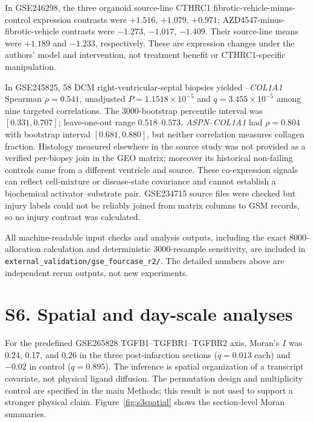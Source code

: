 \documentclass[11pt]{article}
\begin{document}
In GSE246298, the three organoid source-line CTHRC1 fibrotic-vehicle-minus-control expression contrasts were $+1.516$, $+1.079$, $+0.971$; AZD4547-minus-fibrotic-vehicle contrasts were $-1.273$, $-1.017$, $-1.409$. Their source-line means were $+1.189$ and $-1.233$, respectively. These are expression changes under the authors' model and intervention, not treatment benefit or CTHRC1-specific manipulation.

In GSE245825, 58 DCM right-ventricular-septal biopsies yielded \cthrc{}--\textit{COL1A1} Spearman $\rho=0.541$, unadjusted $P=1.1518\times10^{-5}$ and $q=3.455\times10^{-5}$ among nine targeted correlations. The 3000-bootstrap percentile interval was $[0.331,0.707]$; leave-one-out range $0.518$--$0.573$. \textit{ASPN}--\textit{COL1A1} had $\rho=0.804$ with bootstrap interval $[0.681,0.880]$, but neither correlation measures collagen fraction. Histology measured elsewhere in the source study was not provided as a verified per-biopsy join in the GEO matrix; moreover its historical non-failing controls came from a different ventricle and source. These co-expression signals can reflect cell-mixture or disease-state covariance and cannot establish a biochemical activator--substrate pair. GSE234715 source files were checked but injury labels could not be reliably joined from matrix columns to GSM records, so no injury contrast was calculated.\par

All machine-readable input checks and analysis outputs, including the exact 8000-allocation calculation and deterministic 3000-resample sensitivity, are included in \texttt{external\_validation/gse\_fourcase\_r2/}. The detailed numbers above are independent rerun outputs, not new experiments.\par

\section*{S6. Spatial and day-scale analyses}
For the predefined GSE265828 TGFB1--TGFBR1--TGFBR2 axis, Moran's $I$ was 0.24, 0.17, and 0.26 in the three post-infarction sections ($q=0.013$ each) and $-0.02$ in control ($q=0.895$). The inference is spatial organization of a transcript covariate, not physical ligand diffusion. The permutation design and multiplicity control are specified in the main Methods; this result is not used to support a stronger physical claim. Figure~\ref{fig:s3spatial} shows the section-level Moran summaries.
\end{document}
